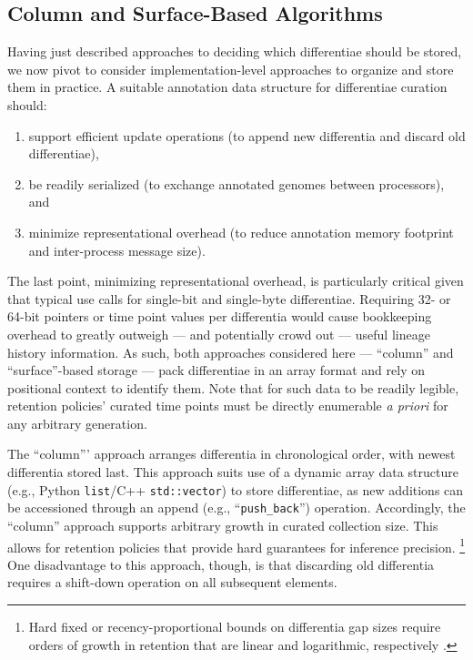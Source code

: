 \subsection{Column and Surface-Based Algorithms}

Having just described approaches to deciding which differentiae should be stored, we now pivot to consider implementation-level approaches to organize and store them in practice.
A suitable annotation data structure for differentiae curation should:
\begin{enumerate}
\item support efficient update operations (to append new differentia and discard old differentiae),
\item be readily serialized (to exchange annotated genomes between processors), and
\item minimize representational overhead (to reduce annotation memory footprint and inter-process message size).
\end{enumerate}

The last point, minimizing representational overhead, is particularly critical given that typical use calls for single-bit and single-byte differentiae.
Requiring 32- or 64-bit pointers or time point values per differentia would cause bookkeeping overhead to greatly outweigh --- and potentially crowd out --- useful lineage history information.
As such, both approaches considered here --- ``column'' and ``surface''-based storage --- pack differentiae in an array format and rely on positional context to identify them.
Note that for such data to be readily legible, retention policies' curated time points must be directly enumerable \textit{a priori} for any arbitrary generation.

The ``column''' approach arranges differentia in chronological order, with newest differentia stored last.
This approach suits use of a dynamic array data structure (e.g., Python \texttt{list}/C++ \texttt{std::vector}) to store differentiae, as new additions can be accessioned through an append (e.g., ``\texttt{push\_back}'') operation.
Accordingly, the ``column'' approach supports arbitrary growth in curated collection size.
This allows for retention policies that provide hard guarantees for inference precision.
\footnote{%
Hard fixed or recency-proportional bounds on differentia gap sizes require orders of growth in retention that are linear and logarithmic, respectively \citep{moreno2024algorithms}.
}
One disadvantage to this approach, though, is that discarding old differentia requires a shift-down operation on all subsequent elements.

